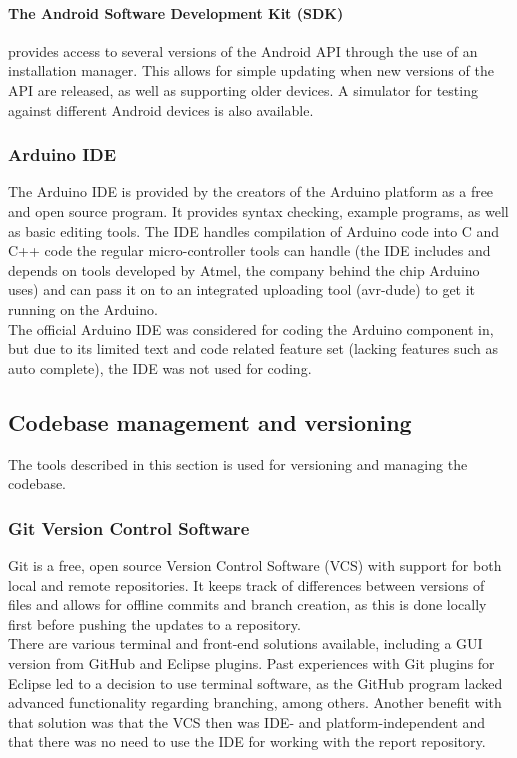 \paragraph{The Android Software Development Kit (SDK)}
provides access to several versions of the Android API through the use of an installation manager. This allows for simple updating when new versions of the API are released, as well as supporting older devices. A simulator for testing against different Android devices is also available.

\subsubsection{Arduino IDE}
The Arduino IDE is provided by the creators of the Arduino platform as a free and open source program. It provides syntax checking, example programs, as well as basic editing tools. The IDE handles compilation of Arduino code into C and C++ code the regular micro-controller tools can handle (the IDE includes and depends on tools developed by Atmel, the company behind the chip Arduino uses) and can pass it on to an integrated uploading tool (avr-dude) to get it running on the Arduino.\\
\newline
The official Arduino IDE was considered for coding the Arduino component in, but due to its limited text and code related feature set (lacking features such as auto complete), the IDE was not used for coding.

\subsection{Codebase management and versioning}
The tools described in this section is used for versioning and managing the codebase. 

\subsubsection{Git Version Control Software}
Git is a free, open source Version Control Software (VCS) with support for both local and remote repositories. It keeps track of differences between versions of files and allows for offline commits and branch creation, as this is done locally first before pushing the updates to a repository.\\
\newline
There are various terminal and front-end solutions available, including a GUI version from GitHub and Eclipse plugins. Past experiences with Git plugins for Eclipse led to a decision to use terminal software, as the GitHub program lacked advanced functionality regarding branching, among others. Another benefit with that solution was that the VCS then was IDE- and platform-independent and that there was no need to use the IDE for working with the report repository.

